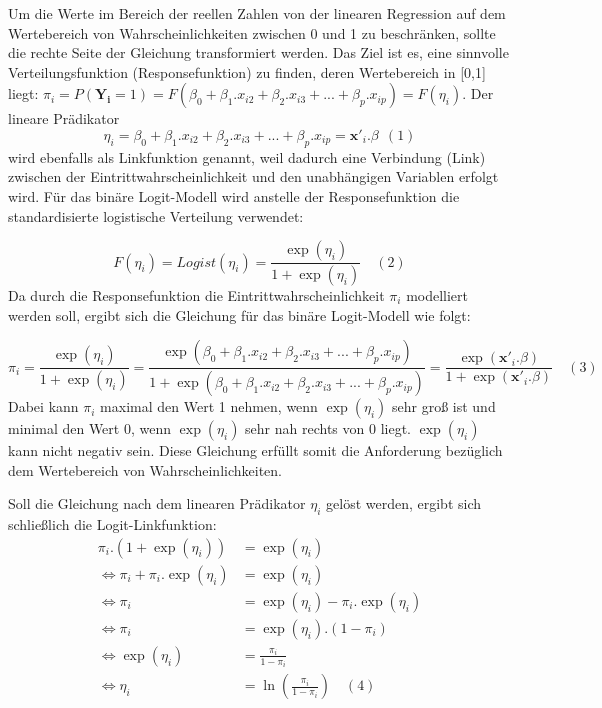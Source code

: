\documentclass[12pt,]{article}
\begin{document}
Um die Werte im Bereich der reellen Zahlen von der linearen Regression
auf dem Wertebereich von Wahrscheinlichkeiten zwischen 0 und 1 zu
beschränken, sollte die rechte Seite der Gleichung transformiert werden.
Das Ziel ist es, eine sinnvolle Verteilungsfunktion (Responsefunktion)
zu finden, deren Wertebereich in {[}0,1{]} liegt:
\(\pi_i = P(\mathbf{Y_i} = 1) = F(\beta_0 + \beta_1.x_{i2} + \beta_2.x_{i3} + ... + \beta_p.x_{ip}) = F(\eta_i)\).
Der lineare Prädikator
\[\eta_i = \beta_0 + \beta_1.x_{i2} + \beta_2.x_{i3} + ... + \beta_p.x_{ip} = \mathbf{x'}_i.\beta \ \ (1)\]
wird ebenfalls als Linkfunktion genannt, weil dadurch eine Verbindung
(Link) zwischen der Eintrittwahrscheinlichkeit und den unabhängigen
Variablen erfolgt wird. Für das binäre Logit-Modell wird anstelle der
Responsefunktion die standardisierte logistische Verteilung verwendet:

\[
F(\eta_i) = Logist(\eta_i) = \frac{\exp(\eta_i)}{1 + \exp(\eta_i)} \quad (2)
\] Da durch die Responsefunktion die Eintrittwahrscheinlichkeit
\(\pi_i\) modelliert werden soll, ergibt sich die Gleichung für das
binäre Logit-Modell wie folgt:

\[
\pi_i = \frac{\exp(\eta_i)}{1 + \exp(\eta_i)} = \frac{\exp(\beta_0 + \beta_1.x_{i2} + \beta_2.x_{i3} + ... + \beta_p.x_{ip})}{1 + \exp(\beta_0 + \beta_1.x_{i2} + \beta_2.x_{i3} + ... + \beta_p.x_{ip})} = \frac{\exp(\mathbf{x'}_i.\beta)}{1+\exp(\mathbf{x'}_i.\beta)} \quad (3)
\] Dabei kann \(\pi_i\) maximal den Wert 1 nehmen, wenn \(\exp(\eta_i)\)
sehr groß ist und minimal den Wert 0, wenn \(\exp(\eta_i)\) sehr nah
rechts von 0 liegt. \(\exp(\eta_i)\) kann nicht negativ sein. Diese
Gleichung erfüllt somit die Anforderung bezüglich dem Wertebereich von
Wahrscheinlichkeiten.

Soll die Gleichung nach dem linearen Prädikator \(\eta_i\) gelöst
werden, ergibt sich schließlich die Logit-Linkfunktion: \[
\begin{aligned}
\pi_i.(1 + \exp(\eta_i)) &= \exp(\eta_i) \\
\Leftrightarrow \pi_i + \pi_i.\exp(\eta_i) &= \exp(\eta_i) \\
\Leftrightarrow \pi_i &= \exp(\eta_i) - \pi_i.\exp(\eta_i)  \\
\Leftrightarrow \pi_i &= \exp(\eta_i).(1-\pi_i) \\
\Leftrightarrow \exp(\eta_i) &= \frac{\pi_i}{1-\pi_i} \\
\Leftrightarrow \eta_i &= \ln(\frac{\pi_i}{1-\pi_i}) \quad (4)\\
\end{aligned} 
\]
\end{document}
